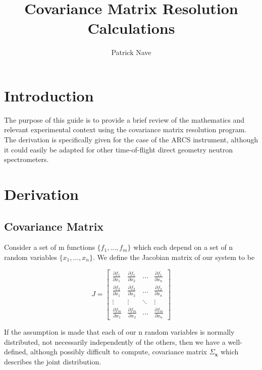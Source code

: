 \documentclass[aps,prl,twocolumn,groupedaddress]{revtex4-1}
\begin{document}
\title{Covariance Matrix Resolution Calculations}
\author{Patrick Nave}
\maketitle

\section{Introduction}

The purpose of this guide is to provide a brief review of the mathematics and relevant experimental context using the covariance matrix resolution program.  The derivation is specifically given for the case of the ARCS instrument, although it could easily be adapted for other time-of-flight direct geometry neutron spectrometers.

\section{Derivation}

\subsection{Covariance Matrix}

Consider a set of m functions $\{f_1, ..., f_m\}$ which each depend on a set of n random variables $\{x_1, ..., x_n\}$.  We define the Jacobian matrix of our system to be

\begin{equation}
J = 
\begin{bmatrix}
    \frac{\partial f_1}{\partial x_1} & \frac{\partial f_1}{\partial x_2} & \dots  & \frac{\partial f_1}{\partial x_n} \\
    \frac{\partial f_2}{\partial x_1} & \frac{\partial f_2}{\partial x_2} & \dots  & \frac{\partial f_2}{\partial x_n} \\
    \vdots & \vdots & \ddots & \vdots \\
    \frac{\partial f_m}{\partial x_1} & \frac{\partial f_m}{\partial x_2} & \dots  & \frac{\partial f_m}{\partial x_n}
\end{bmatrix}
\end{equation}

If the assumption is made that each of our n random variables is normally distributed, not necessarily independently of the others, then we have a well-defined, although possibly difficult to compute, covariance matrix $\Sigma_{\mathbf{x}}$ which describes the joint distribution.
\end{document}
